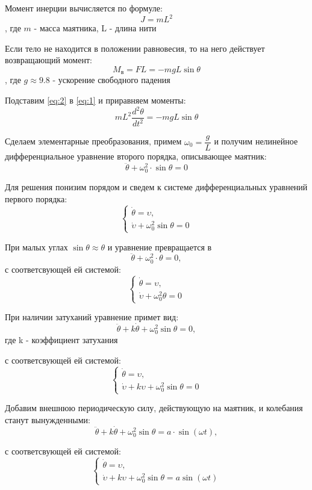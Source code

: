 \documentclass[a4paper, 14pt]{extarticle}
\begin{document}
		Момент инерции вычисляется по формуле:
		\[ J = mL^2 \tag{2} \label{eq:2} \], где $m$ - масса маятника, L - длина нити
		
		Если тело не находится в положении равновесия, то на него действует возвращающий момент:
		\[ M_{\text{в}} = FL = -mgL\sin{\theta} \], где $g \approx 9.8$ - ускорение свободного падения
		
		Подставим \eqref{eq:2} в \eqref{eq:1} и приравняем моменты:
		\[ mL^2\dfrac{d^2\theta}{dt^2} = -mgL\sin{\theta} \] 
		
		Сделаем элементарные преобразования, примем $\omega_0 = \dfrac{g}{L}$ и получим нелинейное дифференциальное уравнение второго порядка, описывающее маятник:
		\[ \ddot{\theta} + \omega_0^2 \cdot \sin{\theta} = 0 \]
		
		Для решения понизим порядом и сведем к системе дифференциальных уравнений первого порядка:
		\[\begin{cases}
			\dot{\theta} = \upsilon, \\
			\dot{\upsilon} + \omega_0^2\sin{\theta} = 0
		\end{cases}\]
		
		При малых углах \( \sin{\theta} \approx \theta \) и уравнение превращается в
		\[ \ddot{\theta} + \omega_0^2 \cdot \theta = 0, \]
		с соответсвующей ей системой:
		\[\begin{cases}
			\dot{\theta} = \upsilon, \\
			\dot{\upsilon} + \omega_0^2\theta = 0
		\end{cases}\]
		
		При наличии затуханий уравнение примет вид:
		\[ \ddot{\theta} + k \dot{\theta} + \omega_0^2\sin{\theta} = 0, \]
		где k - коэффициент затухания
		
		с соответсвующей ей системой:
		\[\begin{cases}
			\dot{\theta} = \upsilon, \\
			\dot{\upsilon} + k\upsilon +\omega_0^2\sin{\theta} = 0
		\end{cases}\]
		
		Добавим внешнюю периодическую силу, действующую на маятник, и колебания станут вынужденными:
		\[ \ddot{\theta} + k \dot{\theta} + \omega_0^2\sin{\theta} = a \cdot \sin{(\omega t)}, \]
		
		с соответсвующей ей системой:
		\[\begin{cases}
			\dot{\theta} = \upsilon, \\
			\dot{\upsilon} + k\upsilon +\omega_0^2\sin{\theta} = a\sin{(\omega t)}
		\end{cases}\]
	
\end{document}
